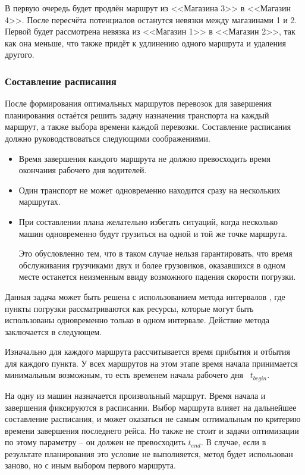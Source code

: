 	В первую очередь будет продлён маршрут из <<Магазина 3>> в <<Магазин 4>>. После пересчёта потенциалов останутся невязки между магазинами 1 и 2. Первой будет рассмотрена невязка из <<Магазин 1>> в <<Магазин 2>>, так как она меньше, что также придёт к удлинению одного маршрута и удаления другого.

	\subsubsection{Составление расписания}
	После формирования оптимальных маршрутов перевозок для завершения планирования остаётся решить задачу назначения транспорта на каждый маршрут, а также выбора времени каждой перевозки. Составление расписания должно руководствоваться следующими соображениями.
	
	\begin{itemize}
		\item Время завершения каждого маршрута не должно превосходить время \, окончания рабочего дня водителей.
		\item Один транспорт не может одновременно находится сразу на нескольких маршрутах.
		\item При составлении плана желательно избегать ситуаций, когда несколько машин одновременно будут грузиться на одной и той же точке маршрута. 
		
		Это обусловленно тем, что в таком случае нельзя гарантировать, что время обслуживания грузчиками двух и более грузовиков, оказавшихся в одном месте останется неизменным ввиду возможного падения скорости погрузки.
	\end{itemize}
	
	Данная задача может быть решена с использованием метода интервалов \cite{schedule:intervals}, где пункты погрузки рассматриваются как ресурсы, которые могут быть использованы одновременно только в одном интервале. Действие метода заключается в следующем.
	
	Изначально для каждого маршрута рассчитывается время прибытия и отбытия для каждого пункта. У всех маршрутов на этом этапе время начала принимается минимальным возможным, то есть временем начала рабочего дня \, $t_{begin}$.
	
	На одну из машин назначается произвольный маршрут. Время начала и завершения фиксируются в расписании. Выбор маршрута влияет на дальнейшее составление расписания, и может оказаться не самым оптимальным по критерию времени завершения последнего рейса. Но также не стоит и задачи оптимизации по этому параметру -- он должен не превосходить $t_{end}$. В случае, если в результате планирования это условие не выполняется, метод будет использован заново, но с иным выбором первого маршрута.
	
